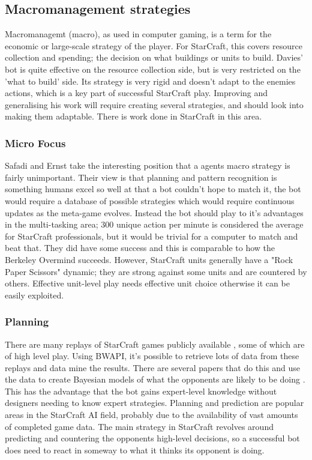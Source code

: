 \documentclass[11pt,openright,a4paper]{report}
\begin{document}
\subsection{Macromanagement strategies}
Macromanagemt (macro), as used in computer gaming, is a term for the economic or large-scale strategy of the player. For StarCraft, this covers resource collection and spending; the decision on what buildings or units to build. Davies' bot is quite effective on the resource collection side, but is very restricted on the 'what to build' side. Its strategy is very rigid and doesn't adapt to the enemies actions, which is a key part of successful StarCraft play. Improving and generalising his work will require creating several strategies, and should look into making them adaptable. There is work done in StarCraft in this area.

\subsubsection{Micro Focus}
Safadi and Ernst \cite{safadi2010organization} take the interesting position that a agents macro strategy is fairly unimportant. Their view is that planning and pattern recognition is something humans excel so well at that a bot couldn't hope to match it, the bot would require a database of possible strategies which would require continuous updates as the meta-game evolves. Instead the bot should play to it's advantages in the multi-tasking area; 300 unique action per minute is considered the average for StarCraft professionals, but it would be trivial for a computer to match and beat that. They did have some success and this is comparable to how the Berkeley Overmind succeeds. However, StarCraft units generally have a "Rock Paper Scissors" dynamic; they are strong against some units and are countered by others. Effective unit-level play needs effective unit choice otherwise it can be easily exploited.

\subsubsection{Planning}
There are many replays of StarCraft games publicly available \cite{Replays}, some of which are of high level play. Using BWAPI, it's possible to retrieve lots of data from these replays and data mine the results. There are several papers that do this and use the data to create Bayesian models of what the opponents are likely to be doing \cite{synnaeve2011bayesian,hostetler2012inferring,weber2009data}.  This has the advantage that the bot gains expert-level knowledge without designers needing to know expert strategies. Planning and prediction are popular areas in the StarCraft AI field, probably due to the availability of vast amounts of completed game data. The main strategy in StarCraft revolves around predicting and countering the opponents high-level decisions, so a successful bot does need to react in someway to what it thinks its opponent is doing.
\end{document}
